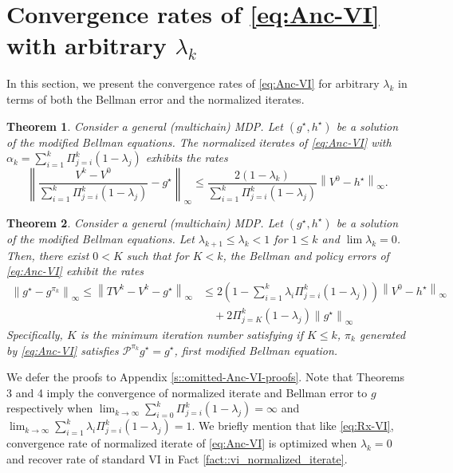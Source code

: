 \documentclass{article} %
\newcommand{\cP}{\mathcal{P}}
\newcommand*{\para}[1]{\left({#1}\right)}
\newcommand*{\infn}[1]{\left\|{#1}\right\|_{\infty}}
\newtheorem{theorem}{Theorem}
\begin{document}
\section{Convergence rates of \ref{eq:Anc-VI} with arbitrary $\lambda_k$}\label{s::omitted-Anc-theorems}
In this section, we present the convergence rates of \ref{eq:Anc-VI} for arbitrary $\lambda_k$ in terms of both the Bellman error and the normalized iterates.
\begin{theorem}\label{thm::anc_normalized_iterate}
Consider a general (multichain) MDP. Let $(g^{\star},h^{\star})$ be a solution of the modified Bellman equations. The normalized iterates of  \ref{eq:Anc-VI}  with $\alpha_k = \sum_{i=1}^{k} \Pi^k_{j=i} (1-\lambda_j)$ exhibits the rates 
   \[\infn{\frac{V^k-V^0}{\sum_{i=1}^{k} \Pi^k_{j=i} (1-\lambda_j)}-g^{\star}} \le \frac{2(1-\lambda_k)}{\sum_{i=1}^{k} \Pi^k_{j=i} (1-\lambda_j)}\infn{V^0-h^{\star}}.\]
\end{theorem}
\begin{theorem}\label{thm::anc_bellman}
Consider a general (multichain) MDP. Let $(g^{\star},h^{\star})$ be a solution of the modified Bellman equations. Let $\lambda_{k+1} \le \lambda_{k}<1$ for $1 \le k$ and $\lim \lambda_k = 0$. Then, there exist $ 0<K$ such that for $K< k$, the Bellman and policy errors of \ref{eq:Anc-VI} exhibit the rates 
     \begin{align*}
       \infn{g^{\star}-g^{\pi_k}} \le   \infn{TV^k-V^k-g^{\star}} &\le 2\para{1-\sum_{i=1}^{k} \lambda_i \Pi^{k}_{j=i} (1-\lambda_j)}\infn{V^0-h^{\star}} \\& \quad +  2\Pi^{k}_{j=K} (1-\lambda_j) \infn{g^\star}
     \end{align*}
     Specifically, $K$ is the minimum iteration number satisfying if $K\le k$, $\pi_k$ generated by \ref{eq:Anc-VI} satisfies $\cP^{\pi_k}g^{\star}=g^{\star}$, first modified Bellman equation.
\end{theorem}
We defer the proofs to Appendix \ref{s::omitted-Anc-VI-proofs}. Note that Theorems 3 and 4 imply the convergence of normalized iterate and Bellman error to $g$ respectively when $\lim_{k\rightarrow \infty} \sum_{i=0}^{k} \Pi^{k}_{j=i} (1-\lambda_j) = \infty$ and $\lim_{k\rightarrow \infty}\sum^{k}_{i=1}  \lambda_i \Pi^k_{j=i}(1-\lambda_j)  = 1$. We briefly mention that like \ref{eq:Rx-VI}, convergence rate of normalized iterate of \ref{eq:Anc-VI} is optimized when $\lambda_k=0$ and recover rate of standard VI in Fact \ref{fact::vi_normalized_iterate}. 
\end{document}

